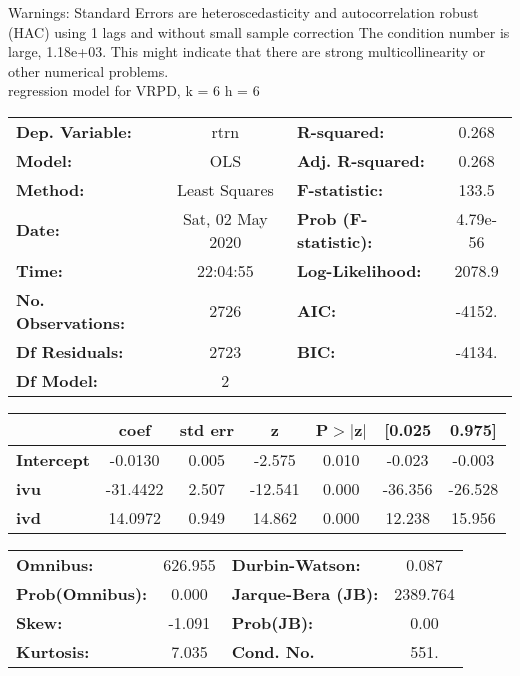 Warnings: \newline
 [1] Standard Errors are heteroscedasticity and autocorrelation robust (HAC) using 1 lags and without small sample correction \newline
 [2] The condition number is large, 1.18e+03. This might indicate that there are \newline
 strong multicollinearity or other numerical problems.\\ 

regression model for VRPD, k = 6 h = 6\begin{center}
\begin{tabular}{lclc}
\toprule
\textbf{Dep. Variable:}    &       rtrn       & \textbf{  R-squared:         } &     0.268   \\
\textbf{Model:}            &       OLS        & \textbf{  Adj. R-squared:    } &     0.268   \\
\textbf{Method:}           &  Least Squares   & \textbf{  F-statistic:       } &     133.5   \\
\textbf{Date:}             & Sat, 02 May 2020 & \textbf{  Prob (F-statistic):} &  4.79e-56   \\
\textbf{Time:}             &     22:04:55     & \textbf{  Log-Likelihood:    } &    2078.9   \\
\textbf{No. Observations:} &        2726      & \textbf{  AIC:               } &    -4152.   \\
\textbf{Df Residuals:}     &        2723      & \textbf{  BIC:               } &    -4134.   \\
\textbf{Df Model:}         &           2      & \textbf{                     } &             \\
\bottomrule
\end{tabular}
\begin{tabular}{lcccccc}
                   & \textbf{coef} & \textbf{std err} & \textbf{z} & \textbf{P$> |$z$|$} & \textbf{[0.025} & \textbf{0.975]}  \\
\midrule
\textbf{Intercept} &      -0.0130  &        0.005     &    -2.575  &         0.010        &       -0.023    &       -0.003     \\
\textbf{ivu}       &     -31.4422  &        2.507     &   -12.541  &         0.000        &      -36.356    &      -26.528     \\
\textbf{ivd}       &      14.0972  &        0.949     &    14.862  &         0.000        &       12.238    &       15.956     \\
\bottomrule
\end{tabular}
\begin{tabular}{lclc}
\textbf{Omnibus:}       & 626.955 & \textbf{  Durbin-Watson:     } &    0.087  \\
\textbf{Prob(Omnibus):} &   0.000 & \textbf{  Jarque-Bera (JB):  } & 2389.764  \\
\textbf{Skew:}          &  -1.091 & \textbf{  Prob(JB):          } &     0.00  \\
\textbf{Kurtosis:}      &   7.035 & \textbf{  Cond. No.          } &     551.  \\
\bottomrule
\end{tabular}
\end{center}


